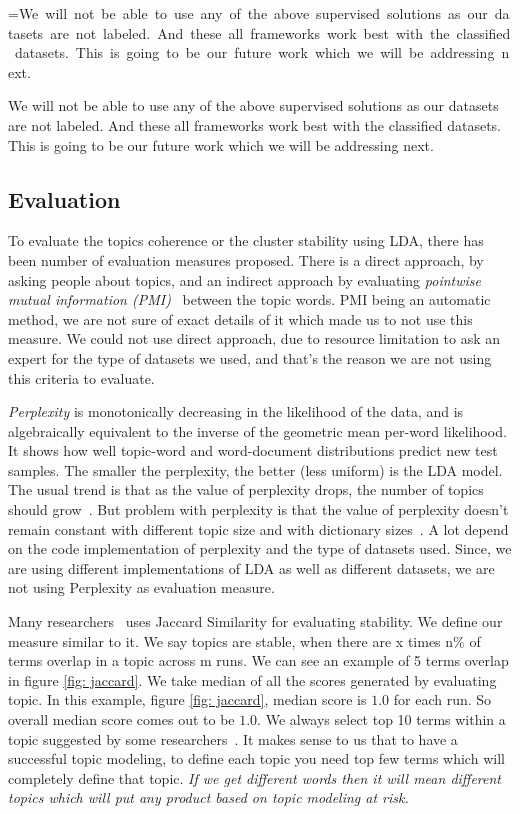 \documentclass[conference]{IEEEtran}
\makeatletter
\newcommand{\mybox}[1]{%
  \setbox0=\hbox{#1}%
  \setlength{\@tempdima}{\dimexpr\linewidth}%
  \begin{tcolorbox}[colframe=mycolor,boxrule=0.5pt,arc=4pt,
      left=6pt,right=6pt,top=6pt,bottom=6pt,boxsep=0pt,width=\@tempdima]
    #1
  \end{tcolorbox}
}
\theoremstyle{break}
\makeatother
\begin{document}
\mybox{We will not be able to use any of the above supervised solutions as our datasets are not labeled. And these all frameworks work best with the classified datasets. This is going to be our future work which we will be addressing next.}

\subsection{Evaluation}
\label{sect: evaluation}
To evaluate the topics coherence or the cluster stability using LDA, there has been number of evaluation measures proposed. There is a direct approach, by asking people about topics, and an indirect approach by evaluating \textit{pointwise mutual information (PMI)}~\cite{lau2014machine, o2015analysis} between the topic words. PMI being an automatic method, we are not sure of exact details of it which made us to not use this measure. We could not use direct approach, due to resource limitation to ask an expert for the type of datasets we used, and that's the reason we are not using this criteria to evaluate.

\textit{Perplexity} is monotonically decreasing in the likelihood of the data, and is algebraically equivalent to the inverse of the geometric mean per-word likelihood. It shows how well topic-word and word-document distributions predict new test samples. The smaller the perplexity, the better (less uniform) is the LDA model. The usual trend is that as the value of perplexity drops, the number of topics should grow~\cite{koltcov2014latent}. But problem with perplexity is that the value of perplexity doesn't remain constant with different topic size and with dictionary sizes~\cite{koltcov2014latent, zhao2015heuristic}. A lot depend on the code implementation of perplexity and the type of datasets used. Since, we are using different implementations of LDA as well as different datasets, we are not using Perplexity as evaluation measure.

Many researchers~\cite{o2015analysis, galvis2013analysis} uses Jaccard Similarity for evaluating stability. We define our measure similar to it. We say topics are stable, when there are x times n\% of terms overlap in a topic across m runs. We can see an example of 5 terms overlap in figure \ref{fig: jaccard}. We take median of all the scores generated by evaluating topic. In this example, figure \ref{fig: jaccard}, median score is $1.0$ for each run. So overall median score comes out to be $1.0$. We always select top 10 terms within a topic suggested by some researchers~\cite{panichella2013effectively, lukins2010bug}. It makes sense to us that to have a successful topic modeling, to define each topic you need top few terms which will completely define that topic. \textit{If we get different words then it will mean different topics which will put any product based on topic modeling at risk.}
\end{document}
